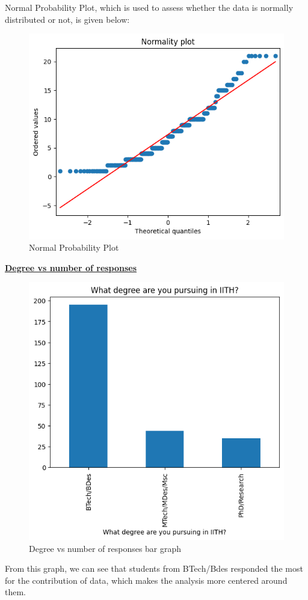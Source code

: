 \documentclass{article}
\begin{document}
Normal Probability Plot, which is used to assess whether the data is normally distributed or not, is given below:
\begin{figure}[H]
    \centering
    \includegraphics[scale = 0.9]{normality_plot.png}
    \caption{Normal Probability Plot}  
    \label{Normality_plot}
\end{figure}

\pagebreak
\centerline{\underline{\bfseries{ Degree vs number of responses}}}

\begin{figure}[H]
    \centering
    \includegraphics[scale = 0.7]{bar_degree.png}
    \caption{Degree vs number of responses bar graph}  
    \label{fig:Normality_plot}
\end{figure}
From this graph, we can see that students from BTech/Bdes responded the most for the contribution of data, which makes the analysis more centered around them.
\end{document}

